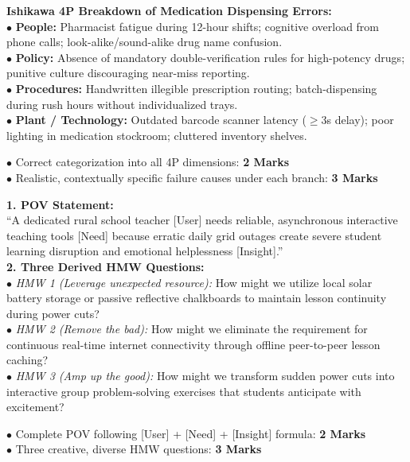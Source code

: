 \begin{solutionbox}
\textbf{Ishikawa 4P Breakdown of Medication Dispensing Errors:}\\
$\bullet$ \textbf{People:} Pharmacist fatigue during 12-hour shifts; cognitive overload from phone calls; look-alike/sound-alike drug name confusion.\\
$\bullet$ \textbf{Policy:} Absence of mandatory double-verification rules for high-potency drugs; punitive culture discouraging near-miss reporting.\\
$\bullet$ \textbf{Procedures:} Handwritten illegible prescription routing; batch-dispensing during rush hours without individualized trays.\\
$\bullet$ \textbf{Plant / Technology:} Outdated barcode scanner latency ($\ge 3$s delay); poor lighting in medication stockroom; cluttered inventory shelves.
\begin{markingrubric}
$\bullet$ Correct categorization into all 4P dimensions: \textbf{2 Marks}\\
$\bullet$ Realistic, contextually specific failure causes under each branch: \textbf{3 Marks}
\end{markingrubric}
\end{solutionbox}

\begin{solutionbox}
\textbf{1. POV Statement:}\\
``A dedicated rural school teacher [User] needs reliable, asynchronous interactive teaching tools [Need] because erratic daily grid outages create severe student learning disruption and emotional helplessness [Insight].''\\
\textbf{2. Three Derived HMW Questions:}\\
$\bullet$ \textit{HMW 1 (Leverage unexpected resource):} How might we utilize local solar battery storage or passive reflective chalkboards to maintain lesson continuity during power cuts?\\
$\bullet$ \textit{HMW 2 (Remove the bad):} How might we eliminate the requirement for continuous real-time internet connectivity through offline peer-to-peer lesson caching?\\
$\bullet$ \textit{HMW 3 (Amp up the good):} How might we transform sudden power cuts into interactive group problem-solving exercises that students anticipate with excitement?
\begin{markingrubric}
$\bullet$ Complete POV following [User] + [Need] + [Insight] formula: \textbf{2 Marks}\\
$\bullet$ Three creative, diverse HMW questions: \textbf{3 Marks}
\end{markingrubric}
\end{solutionbox}
